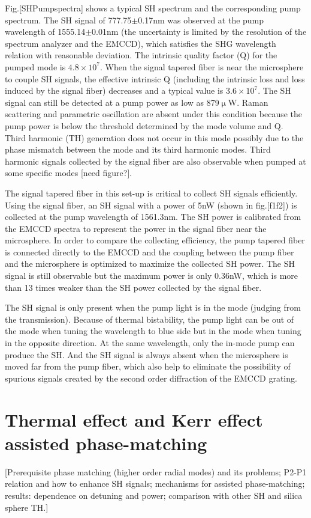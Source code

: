 \documentclass[a4paper,12pt,hyperref]{article}
\begin{document}
Fig.[SHPumpspectra] shows a typical SH spectrum and the corresponding pump spectrum. The SH signal of 777.75$\pm$0.17nm was observed at the pump wavelength of 1555.14$\pm$0.01nm (the uncertainty is limited by the resolution of the spectrum analyzer and the EMCCD), which satisfies the SHG wavelength relation with reasonable deviation. The intrinsic quality factor (Q) for the pumped mode is $4.8\times10^7$. When the signal tapered fiber is near the microsphere to couple SH signals, the effective intrinsic Q (including the intrinsic loss and loss induced by the signal fiber) decreases and a typical value is $3.6\times 10^7$. The SH signal can still be detected at a pump power as low as 879$\upmu $W. Raman scattering and parametric oscillation are absent under this condition because the pump power is below the threshold determined by the mode volume and Q\cite{spillane2002ultralow, kippenberg2004kerr}. Third harmonic (TH) generation does not occur in this mode possibly due to the phase mismatch between the mode and its third harmonic modes\cite{carmon2007visible}. Third harmonic signals  collected by the signal fiber are also observable when pumped at some specific modes [need figure?]. 

The signal tapered fiber in this set-up is critical to collect SH signals efficiently. Using the signal fiber, an SH signal with a power of 5nW (shown in fig.[f1f2]) is collected at the pump wavelength of 1561.3nm. The SH power is calibrated from the EMCCD spectra to represent the power in the signal fiber near the microsphere. In order to compare the collecting efficiency, the pump tapered fiber is connected directly to the EMCCD and the coupling between the pump fiber and the microsphere is optimized to maximize the collected SH power. The SH signal is still observable but the maximum power is only 0.36nW, which is more than 13 times weaker than the SH power collected by the signal fiber.

The SH signal is only present when the pump light is in the mode (judging from the transmission). Because of thermal bistability\cite{carmon2004dynamical}, the pump light can be out of the mode when tuning the wavelength to blue side but in the mode when tuning in the opposite direction. At the same wavelength, only the in-mode pump can produce the SH. And the SH signal is always absent when the microsphere is moved far from the pump fiber, which also help to eliminate the possibility of spurious signals created by the second order diffraction of the EMCCD grating.

\section{Thermal effect and Kerr effect assisted phase-matching}
[Prerequisite phase matching (higher order radial modes) and its problems; P2-P1 relation and how to enhance SH signals; mechanisms for assisted phase-matching; results: dependence on detuning and power; comparison with other SH and silica sphere TH.]
\end{document}
